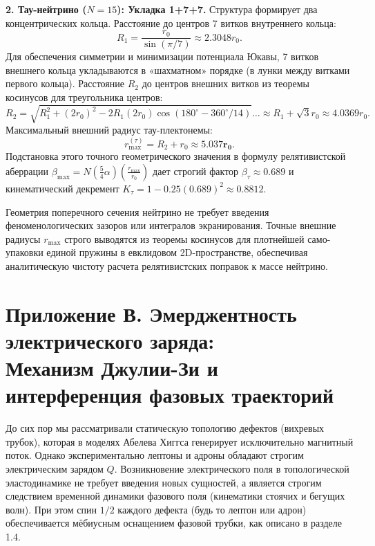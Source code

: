 \documentclass[11pt,a4paper]{article}
\begin{document}
	\textbf{2. Тау-нейтрино ($N=15$): Укладка 1+7+7.}
	Структура формирует два концентрических кольца. Расстояние до центров 7 витков внутреннего кольца:
	\begin{equation}
		R_1 = \frac{r_0}{\sin(\pi/7)} \approx 2.3048 r_0.
	\end{equation}
	Для обеспечения симметрии и минимизации потенциала Юкавы, 7 витков внешнего кольца укладываются в «шахматном» порядке (в лунки между витками первого кольца). Расстояние $R_2$ до центров внешних витков из теоремы косинусов для треугольника центров:
	\begin{equation}
		R_2 = \sqrt{R_1^2 + (2r_0)^2 - 2R_1(2r_0)\cos(180^\circ - 360^\circ/14)} \dots \approx R_1 + \sqrt{3}r_0 \approx 4.0369 r_0.
	\end{equation}
	Максимальный внешний радиус тау-плектонемы:
	\begin{equation}
		r_{\text{max}}^{(\tau)} = R_2 + r_0 \approx \mathbf{5.037 r_0}.
	\end{equation}
	Подстановка этого точного геометрического значения в формулу релятивистской аберрации $\beta_{\text{max}} = N (\frac{5}{4}\alpha) (\frac{r_{\text{max}}}{r_0})$ дает строгий фактор $\beta_\tau \approx 0.689$ и кинематический декремент $K_\tau = 1 - 0.25(0.689)^2 \approx \mathbf{0.8812}$.
	
	Геометрия поперечного сечения нейтрино не требует введения феноменологических зазоров или интегралов экранирования. Точные внешние радиусы $r_{\text{max}}$ строго выводятся из теоремы косинусов для плотнейшей само-упаковки единой пружины в евклидовом 2D-пространстве, обеспечивая аналитическую чистоту расчета релятивистских поправок к массе нейтрино.
	
	\section*{Приложение В. Эмерджентность электрического заряда:\\ Механизм Джулии-Зи и интерференция фазовых траекторий}
	
	До сих пор мы рассматривали статическую топологию дефектов (вихревых трубок), которая в моделях Абелева Хиггса генерирует исключительно магнитный поток. Однако экспериментально лептоны и адроны обладают строгим электрическим зарядом $Q$. Возникновение электрического поля в топологической эластодинамике не требует введения новых сущностей, а является строгим следствием временной динамики фазового поля (кинематики стоячих и бегущих волн). При этом спин $1/2$ каждого дефекта (будь то лептон или адрон) обеспечивается мёбиусным оснащением фазовой трубки, как описано в разделе 1.4.
	
\end{document}
